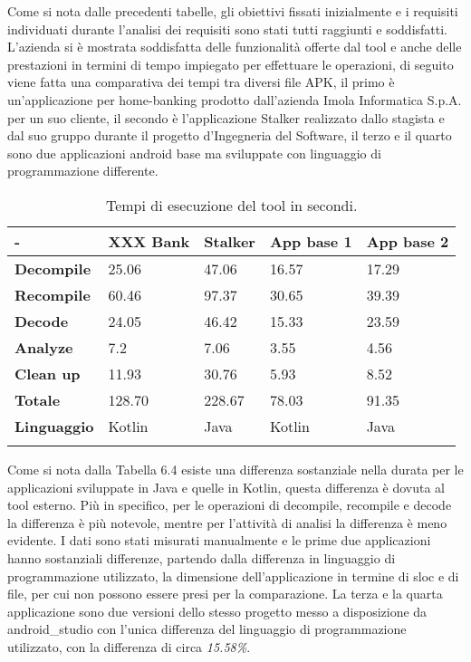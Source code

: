 Come si nota dalle precedenti tabelle, gli obiettivi fissati inizialmente e i requisiti individuati durante l'analisi dei requisiti sono stati tutti raggiunti e soddisfatti.\\
L'azienda si è mostrata soddisfatta delle funzionalità offerte dal tool e anche delle prestazioni in termini di tempo impiegato per effettuare le operazioni, di seguito viene fatta una comparativa dei tempi tra diversi file APK, il primo è un'applicazione per home-banking prodotto dall'azienda Imola Informatica S.p.A. per un suo cliente, il secondo è l'applicazione Stalker realizzato dallo stagista e dal suo gruppo durante il progetto d'Ingegneria del Software, il terzo e il quarto sono due applicazioni android base ma sviluppate con linguaggio di programmazione differente.
\begin{longtable}{| C{2cm}| C{2cm}| C{2.5cm}| C{2.5cm}| C{2.5cm}|}
    \hline
    -                   & \textbf{XXX Bank} & \textbf{Stalker} & \textbf{App base 1} & \textbf{App base 2} \\\hline
    \textbf{Decompile}  & 25.06             & 47.06            & 16.57               & 17.29               \\\hline
    \textbf{Recompile}  & 60.46             & 97.37            & 30.65               & 39.39               \\\hline
    \textbf{Decode}     & 24.05             & 46.42            & 15.33               & 23.59               \\\hline
    \textbf{Analyze}    & 7.2               & 7.06             & 3.55                & 4.56               \\\hline
    \textbf{Clean up}   & 11.93             & 30.76            & 5.93                & 8.52                \\\hline
    \textbf{Totale}     & 128.70            & 228.67           & 78.03               & 91.35               \\\hline
    \textbf{Linguaggio} & Kotlin            & Java             & Kotlin              & Java                \\\hline
    \caption{Tempi di esecuzione del tool in secondi.}
\end{longtable}
Come si nota dalla Tabella 6.4 esiste una differenza sostanziale nella durata per le applicazioni sviluppate in Java e quelle in Kotlin, questa differenza è dovuta al tool esterno.
Più in specifico, per le operazioni di decompile, recompile e decode la differenza è più notevole, mentre per l'attività di analisi la differenza è meno evidente.
I dati sono stati misurati manualmente e le prime due applicazioni hanno sostanziali differenze, partendo dalla differenza in linguaggio di programmazione utilizzato, la dimensione dell'applicazione in termine di \gls{sloc} e di file, per cui non possono essere presi per la comparazione.
La terza e la quarta applicazione sono due versioni dello stesso progetto messo a disposizione da \gls{android_studio} con l'unica differenza del linguaggio di programmazione utilizzato, con la differenza di circa \textit{15.58\%}.
